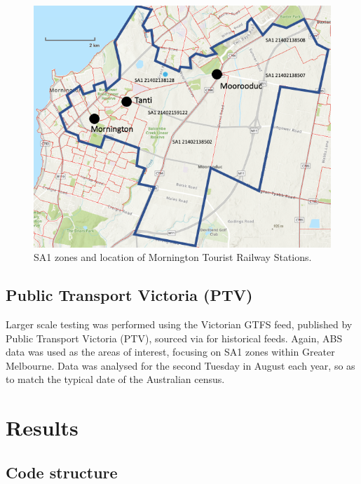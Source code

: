 \documentclass[preprint, 3p,
authoryear]{elsarticle} %
\begin{document}
\begin{figure}
\includegraphics[width=1\linewidth]{graphics/mornington} \caption{SA1 zones and location of Mornington Tourist Railway Stations.}\label{fig:mornington_map_ABS}
\end{figure}

\hypertarget{public-transport-victoria-ptv}{%
\subsection{Public Transport Victoria
(PTV)}\label{public-transport-victoria-ptv}}

Larger scale testing was performed using the Victorian GTFS feed,
published by Public Transport Victoria (PTV), sourced via
\citet{transitfeeds_victoria:2023aa} for historical feeds. Again, ABS
data was used as the areas of interest, focusing on SA1 zones within
Greater Melbourne. Data was analysed for the second Tuesday in August
each year, so as to match the typical date of the Australian census.

\hypertarget{results}{%
\section{Results}\label{results}}

\hypertarget{code-structure}{%
\subsection{Code structure}\label{code-structure}}
\end{document}
